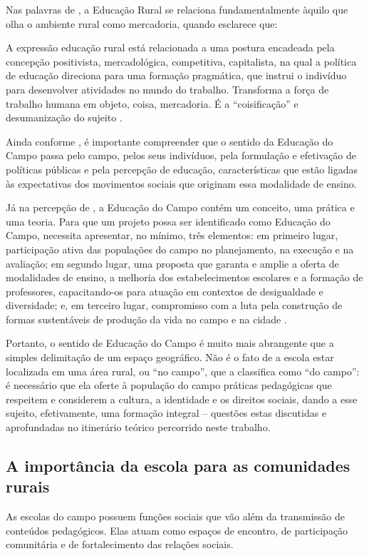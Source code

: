 \documentclass[
  12pt,
  openright,
  twoside,
  a4paper,
  english,
  brazilian,
  sumario=tradicional
]{abntex2}
\begin{document}
Nas palavras de , a Educação Rural se relaciona fundamentalmente àquilo que olha o ambiente rural como mercadoria, quando esclarece que:

\begin{citacao}
A expressão educação rural está relacionada a uma postura encadeada pela concepção positivista, mercadológica, competitiva, capitalista, na qual a política de educação direciona para uma formação pragmática, que instrui o indivíduo para desenvolver atividades no mundo do trabalho. Transforma a força de trabalho humana em objeto, coisa, mercadoria. É a ``coisificação'' e desumanização do sujeito \cite[p.~8]{pinheiro2007}.
\end{citacao}

Ainda conforme , é importante compreender que o sentido da Educação do Campo passa pelo campo, pelos seus indivíduos, pela formulação e efetivação de políticas públicas e pela percepção de educação, características que estão ligadas às expectativas dos movimentos sociais que originam essa modalidade de ensino.

Já na percepção de , a Educação do Campo contém um conceito, uma prática e uma teoria. Para que um projeto possa ser identificado como Educação do Campo, necessita apresentar, no mínimo, três elementos: em primeiro lugar, participação ativa das populações do campo no planejamento, na execução e na avaliação; em segundo lugar, uma proposta que garanta e amplie a oferta de modalidades de ensino, a melhoria dos estabelecimentos escolares e a formação de professores, capacitando-os para atuação em contextos de desigualdade e diversidade; e, em terceiro lugar, compromisso com a luta pela construção de formas sustentáveis de produção da vida no campo e na cidade \cite[p.~19]{antunesrocha2014}.

Portanto, o sentido de Educação do Campo é muito mais abrangente que a simples delimitação de um espaço geográfico. Não é o fato de a escola estar localizada em uma área rural, ou ``no campo'', que a classifica como ``do campo'': é necessário que ela oferte à população do campo práticas pedagógicas que respeitem e considerem a cultura, a identidade e os direitos sociais, dando a esse sujeito, efetivamente, uma formação integral -- questões estas discutidas e aprofundadas no itinerário teórico percorrido neste trabalho.

\subsection{A importância da escola para as comunidades rurais}
As escolas do campo possuem funções sociais que vão além da transmissão de conteúdos pedagógicos. Elas atuam como espaços de encontro, de participação comunitária e de fortalecimento das relações sociais.
\end{document}
